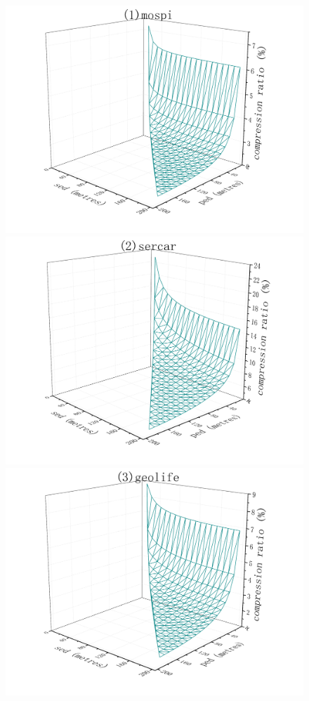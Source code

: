 \begin{figure}[tb!]
	\centering
	\includegraphics[scale = 0.56]{figures/Fig-BITT-mopsi-compression-ratio.png}\hspace{1ex}
	\includegraphics[scale = 0.56]{figures/Fig-BITT-sercar-compression-ratio.png}\hspace{1ex}
	\includegraphics[scale = 0.56]{figures/Fig-BITT-geolife-compression-ratio.png}\hspace{1ex}

\end{figure}

